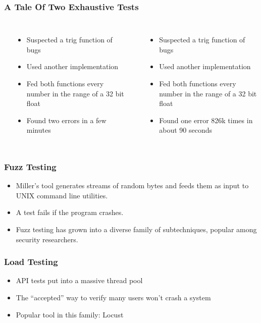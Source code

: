 \begin{frame}
\frametitle{A Tale Of Two Exhaustive Tests}
\begin{columns}[c]
    \textbf{\citet{hoffman2003Exhausting}}
    \begin{itemize}
      \item Suspected a trig function of bugs
      \item Used another implementation
      \item Fed both functions every number in the range of a 32 bit float
      \item Found two errors in a few minutes
    \end{itemize}
    \textbf{\citet{dawsonFourBillion}}
    \begin{itemize}
      \item Suspected a trig function of bugs
      \item Used another implementation
      \item Fed both functions every number in the range of a 32 bit float
      \item Found one error 826k times in about 90 seconds
    \end{itemize}
\end{columns}
\end{frame}

\begin{frame}
  \frametitle{Fuzz Testing}
  \begin{itemize}
    \item Miller's tool generates streams of random bytes and feeds them as input to UNIX command line utilities. \citep{miller1990empirical}
    \item A test fails if the program crashes.
    \item Fuzz testing has grown into a diverse family of subtechniques, popular among security researchers.
  \end{itemize}
\end{frame}

\begin{frame}
  \frametitle{Load Testing}
  \begin{itemize}
    \item API tests put into a massive thread pool
    \item The ``accepted'' way to verify many users won't crash a system
    \item Popular tool in this family: Locust \citep{heymanlocust}
  \end{itemize}
\end{frame}


